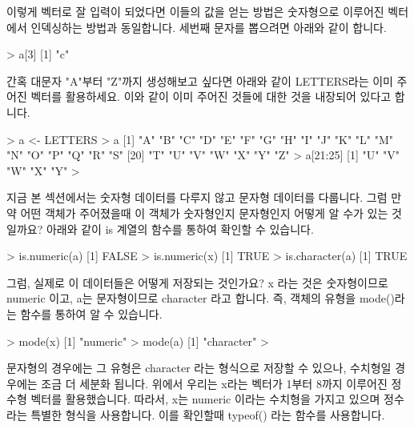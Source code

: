 \documentclass{book}
\begin{document}
이렇게 벡터로 잘 입력이 되었다면 이들의 값을 얻는 방법은 숫자형으로 이루어진 벡터에서 인덱싱하는 방법과 동일합니다. 
세번째 문자를 뽑으려면 아래와 같이 합니다. 

\begin{Schunk}
\begin{Soutput}
> a[3]
[1] "c"
\end{Soutput}
\end{Schunk}

간혹 대문자 "A"부터 "Z"까지 생성해보고 싶다면 아래와 같이 LETTERS라는 이미 주어진 벡터를 활용하세요.
이와 같이 이미 주어진 것들에 대한 것을 내장되어 있다고 합니다. 


\begin{Schunk}
\begin{Soutput}
> a <- LETTERS
> a
 [1] "A" "B" "C" "D" "E" "F" "G" "H" "I" "J" "K" "L" "M" "N" "O" "P" "Q" "R" "S"
[20] "T" "U" "V" "W" "X" "Y" "Z"
> a[21:25]
[1] "U" "V" "W" "X" "Y"
> 
\end{Soutput}
\end{Schunk}

지금 본 섹션에서는 숫자형 데이터를 다루지 않고 문자형 데이터를 다룹니다. 
그럼 만약 어떤 객체가 주어졌을때 이 객체가 숫자형인지 문자형인지 어떻게 알 수가 있는 것일까요?
아래와 같이 is 계열의 함수를 통하여 확인할 수 있습니다. 

\begin{Schunk}
\begin{Soutput}
> is.numeric(a)
[1] FALSE
> is.numeric(x)
[1] TRUE
> is.character(a)
[1] TRUE
\end{Soutput}
\end{Schunk}

그럼, 실제로 이 데이터들은 어떻게 저장되는 것인가요? x 라는 것은 숫자형이므로 numeric 이고, a는 문자형이므로 character 라고 합니다. 
즉, 객체의 유형을 mode()라는 함수를 통하여 알 수 있습니다.  

\begin{Schunk}
\begin{Soutput}
> mode(x)
[1] "numeric"
> mode(a)
[1] "character"
> 
\end{Soutput}
\end{Schunk}

문자형의 경우에는 그 유형은 character 라는 형식으로 저장할 수 있으나, 수치형일 경우에는 조금 더 세분화 됩니다. 
위에서 우리는 x라는 벡터가 1부터 8까지 이루어진 정수형 벡터를 활용했습니다.
따라서, x는 numeric 이라는 수치형을 가지고 있으며 정수라는 특별한 형식을 사용합니다. 
이를 확인할때 typeof() 라는 함수를 사용합니다. 
\end{document}
